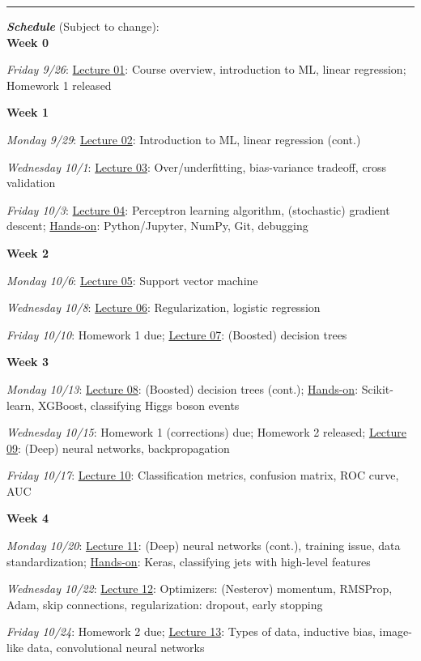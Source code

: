 \documentclass[12pt]{article}
\begin{document}
\begin{center}
	\rule{\textwidth}{0.5pt}
\end{center}

\noindent\textbf{\emph{Schedule}} (Subject to change):\\

\noindent\textbf{Week 0}

\emph{Friday 9/26}: \underline{Lecture 01}: Course overview, introduction to ML, linear regression; Homework 1 released

\noindent\textbf{Week 1}

\emph{Monday 9/29}: \underline{Lecture 02}: Introduction to ML, linear regression (cont.)

\emph{Wednesday 10/1}: \underline{Lecture 03}: Over/underfitting, bias-variance tradeoff, cross validation

\emph{Friday 10/3}: \underline{Lecture 04}: Perceptron learning algorithm, (stochastic) gradient descent; \underline{Hands-on}: Python/Jupyter, NumPy, Git, debugging

\noindent\textbf{Week 2}

\emph{Monday 10/6}: \underline{Lecture 05}: Support vector machine

\emph{Wednesday 10/8}: \underline{Lecture 06}: Regularization, logistic regression

\emph{Friday 10/10}: Homework 1 due; \underline{Lecture 07}: (Boosted) decision trees

\noindent\textbf{Week 3}

\emph{Monday 10/13}: \underline{Lecture 08}: (Boosted) decision trees (cont.); \underline{Hands-on}: Scikit-learn, XGBoost, classifying Higgs boson events

\emph{Wednesday 10/15}: Homework 1 (corrections) due; Homework 2 released; \underline{Lecture 09}: (Deep) neural networks, backpropagation

\emph{Friday 10/17}: \underline{Lecture 10}: Classification metrics, confusion matrix, ROC curve, AUC

\noindent\textbf{Week 4}

\emph{Monday 10/20}: \underline{Lecture 11}: (Deep) neural networks (cont.), training issue, data standardization; \underline{Hands-on}: Keras, classifying jets with high-level features

\emph{Wednesday 10/22}: \underline{Lecture 12}: Optimizers: (Nesterov) momentum, RMSProp, Adam, skip connections, regularization: dropout, early stopping

\emph{Friday 10/24}: Homework 2 due; \underline{Lecture 13}: Types of data, inductive bias, image-like data, convolutional neural networks
\end{document}
